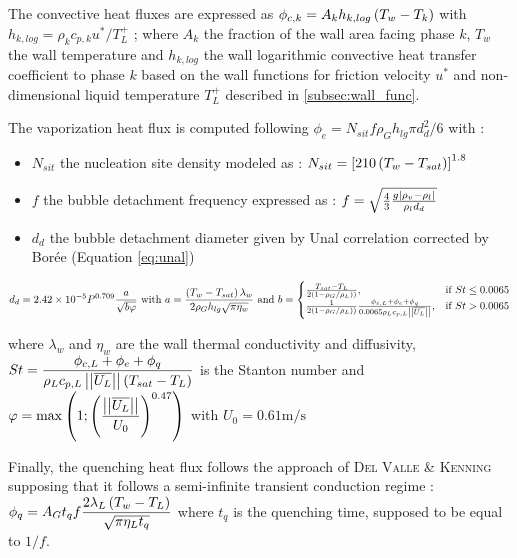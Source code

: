 The convective heat fluxes are expressed as $\phi_{c,k}=A_{k}h_{k,log}\left( T_{w}-T_{k} \right)$ with $ h_{k,log}=\rho_{k}c_{p,k}{u^{*}}/{T_{L}^{+}}$ ; where $A_{k}$ the fraction of the wall area facing phase $k$, $T_{w}$ the wall temperature and $h_{k,log}$ the wall logarithmic convective heat transfer coefficient to phase $k$ based on the wall functions for friction velocity $u^{*}$ and non-dimensional liquid temperature $T_{L}^{+}$ described in \ref{subsec:wall_func}.

The vaporization heat flux is computed following $\phi_{e}=N_{sit}f\rho_{G}h_{lg}{\pi d_{d}^{2}}/{6}$ with :
\begin{itemize}
\item $N_{sit}$ the nucleation site density modeled as \cite{Lemmert1977} : $N_{sit}=\left[ 210\left( T_{w}-T_{sat} \right)  \right]^{1.8}$
\item $f$ the bubble detachment frequency expressed as \cite{Cole1960} : $f=\sqrt{\frac{4}{3}\frac{g\left| \rho_{v}-\rho_{l} \right| }{\rho_{l}d_{d}}}$
\item $d_{d}$ the bubble detachment diameter given by Unal correlation\cite{Unal1976} corrected by Bor\'ee \etal[ref] (Equation \ref{eq:unal})
\end{itemize}

\begin{equation}
\label{eq:unal}
d_{d}=2.42\times 10^{-5} P^{0.709} \frac{a}{\sqrt{b\varphi}}\text{ with } a=\frac{\left( T_{w}-T_{sat} \right) \lambda_{w}}{2\rho_{G}h_{lg}\sqrt{\pi\eta_{w}}} \text{ and } 
  b=\begin{cases}
    \frac{T_{sat}-T_{L}}{2 \left( 1-\rho_{G}/\rho_{L}  \right))}, & \text{if $St\leq0.0065$}\\
    \frac{1}{2 \left( 1-\rho_{G}/\rho_{L}  \right))}\frac{\phi_{c,L}+\phi_{e}+\phi_{q}}{0.0065\rho_{L}c_{p,L}\left|\left|{\overline{U_{L}}}\right|\right|}, & \text{\text{if $St>0.0065$}}
  \end{cases}
\end{equation}

where $\lambda_{w}$ and $\eta_{w}$ are the wall thermal conductivity and diffusivity, $St=\displaystyle \frac{\phi_{c,L}+\phi_{e}+\phi_{q}}{\rho_{L}c_{p,L}\left|\left|{\overline{U_{L}}}\right|\right|\left( T_{sat}-T_{L}  \right)}$ is the Stanton number and $\varphi=\displaystyle \mathrm{max}\left( 1 ; \left( \frac{\left|\left|{\overline{U_{L}}}\right|\right|}{U_{0}}  \right)^{0.47}  \right)$ with $U_{0}=0.61\text{m/s}$

Finally, the quenching heat flux follows the approach of \textsc{Del Valle} \& \textsc{Kenning}\cite{DelValle1985} supposing that it follows a semi-infinite transient conduction regime : $\displaystyle \phi_{q}=A_{G}t_{q}f\frac{2\lambda_{L} \left( T_{w}-T_{L} \right)}{\sqrt{\pi \eta_{L}t_{q}}}$ where $t_{q}$ is the quenching time, supposed to be equal to $1/f$.

